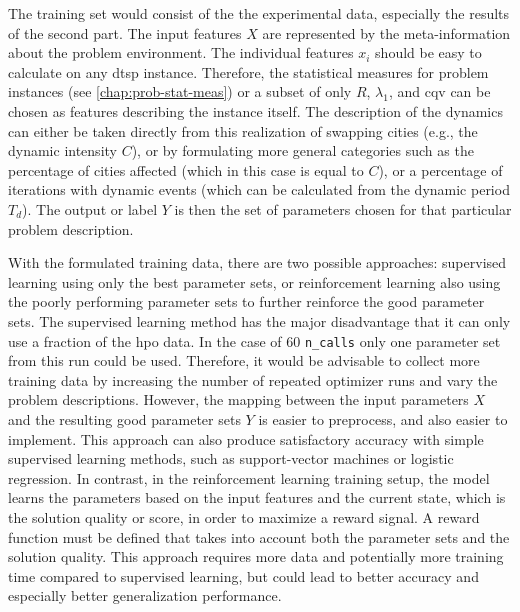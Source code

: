The training set would consist of the the experimental data, especially the results of the second part. The input features $X$ are represented by the meta-information about the problem environment. The individual features $x_i$ should be easy to calculate on any \gls{dtsp} instance. Therefore, the statistical measures for problem instances (see \cref{chap:prob-stat-meas}) or a subset of only $R$, $\lambda_1$, and \gls{cqv} can be chosen as features describing the instance itself. The description of the dynamics can either be taken directly from this realization of swapping cities (e.g., the dynamic intensity $C$), or by formulating more general categories such as the percentage of cities affected (which in this case is equal to $C$), or a percentage of iterations with dynamic events (which can be calculated from the dynamic period $T_d$).
The output or label $Y$ is then the set of parameters chosen for that particular problem description.

With the formulated training data, there are two possible approaches: supervised learning using only the best parameter sets, or reinforcement learning also using the poorly performing parameter sets to further reinforce the good parameter sets.
The supervised learning method has the major disadvantage that it can only use a fraction of the \gls{hpo} data. In the case of 60 \texttt{n\_calls} only one parameter set from this run could be used. Therefore, it would be advisable to collect more training data by increasing the number of repeated optimizer runs and vary the problem descriptions. However, the mapping between the input parameters $X$ and the resulting good parameter sets $Y$ is easier to preprocess, and also easier to implement. This approach can also produce satisfactory accuracy with simple supervised learning methods, such as support-vector machines or logistic regression. 
In contrast, in the reinforcement learning training setup, the model learns the parameters based on the input features and the current state, which is the solution quality or score, in order to maximize a reward signal. A reward function must be defined that takes into account both the parameter sets and the solution quality. This approach requires more data and potentially more training time compared to supervised learning, but could lead to better accuracy and especially better generalization performance. 

